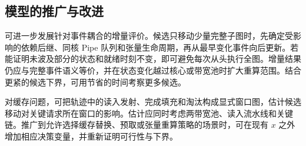 \subsection{模型的推广与改进}
可进一步发展针对事件耦合的增量评价。候选只移动少量完整子图时，先确定受影响的依赖后继、同核 Pipe 队列和张量生命周期，再从最早变化事件向后更新。若能证明未波及部分的状态和就绪时刻不变，即可避免每次从头执行全图。增量结果仍应与完整事件语义等价，并在状态变化越过核心或带宽池时扩大重算范围。结合更紧的候选下界，可用节省的时间考察更多候选。

对缓存问题，可把轨迹中的读入发射、完成填充和淘汰构成显式窗口图，估计候选移动对关键请求所在窗口的影响。估计应同时考虑两带宽池、读入流水线和关键链。推广到允许选择缓存替换、预取或张量重算策略的场景时，可在现有 $x$ 之外增加相应决策变量，并重新证明可行性与下界。
